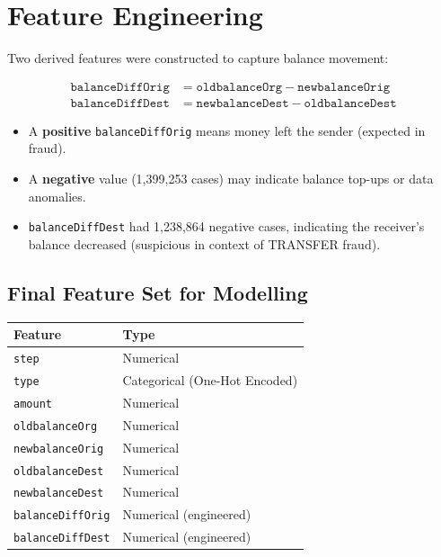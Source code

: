 \documentclass[12pt, a4paper]{article}
\begin{document}
\section{Feature Engineering}

Two derived features were constructed to capture balance movement:

\begin{align}
\texttt{balanceDiffOrig} &= \texttt{oldbalanceOrg} - \texttt{newbalanceOrig} \\
\texttt{balanceDiffDest} &= \texttt{newbalanceDest} - \texttt{oldbalanceDest}
\end{align}

\begin{itemize}
    \item A \textbf{positive} \texttt{balanceDiffOrig} means money left the sender (expected in fraud).
    \item A \textbf{negative} value (1,399,253 cases) may indicate balance top-ups or data anomalies.
    \item \texttt{balanceDiffDest} had 1,238,864 negative cases, indicating the receiver's balance decreased (suspicious in context of TRANSFER fraud).
\end{itemize}

\subsection{Final Feature Set for Modelling}

\begin{center}
\begin{tabular}{ll}
\toprule
\textbf{Feature} & \textbf{Type} \\
\midrule
\texttt{step}            & Numerical \\
\texttt{type}            & Categorical (One-Hot Encoded) \\
\texttt{amount}          & Numerical \\
\texttt{oldbalanceOrg}   & Numerical \\
\texttt{newbalanceOrig}  & Numerical \\
\texttt{oldbalanceDest}  & Numerical \\
\texttt{newbalanceDest}  & Numerical \\
\texttt{balanceDiffOrig} & Numerical (engineered) \\
\texttt{balanceDiffDest} & Numerical (engineered) \\
\bottomrule
\end{tabular}
\end{center}
\end{document}
